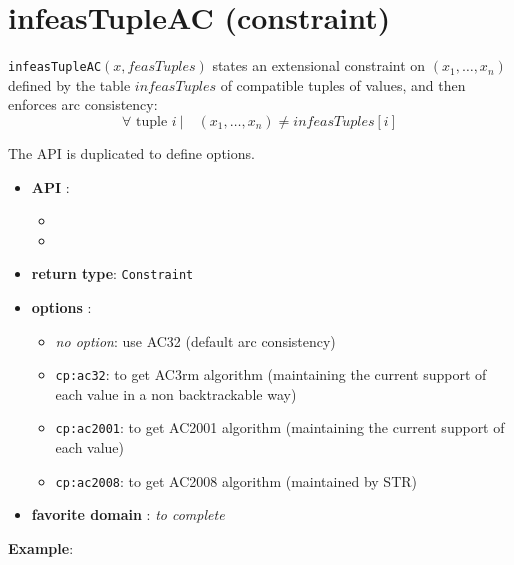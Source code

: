 \label{infeastupleac}
\hypertarget{infeastupleac}{}

\section{infeasTupleAC (constraint)}\label{infeastupleac:infeastupleacconstraint}\hypertarget{infeastupleac:infeastupleacconstraint}{}
\begin{notedef}
  \texttt{infeasTupleAC}$(x,feasTuples)$ states an extensional constraint on $(x_1,\ldots,x_n)$ defined by the table $infeasTuples$ of compatible tuples of values, and then enforces arc consistency:
      $$\forall \text{ tuple } i\ |\quad (x_1,\ldots,x_n)\neq infeasTuples[i]$$
\end{notedef}

The API is duplicated to define options.
\begin{itemize}
	\item \textbf{API} :
	\begin{itemize}
		\item {}
		\item {}
	\end{itemize}
	\item \textbf{return type}: \texttt{Constraint}
	\item \textbf{options} :
	\begin{itemize}
		\item \emph{no option}: use AC32 (default arc consistency)
		\item \texttt{cp:ac32}: to get AC3rm algorithm (maintaining the current support of each value in a non backtrackable way)
		\item \texttt{cp:ac2001}: to get AC2001 algorithm (maintaining the current support of each value)
		\item \texttt{cp:ac2008}: to get AC2008 algorithm (maintained by STR)
	\end{itemize}
	\item \textbf{favorite domain} : \emph{to complete}
\end{itemize}

\textbf{Example}:

